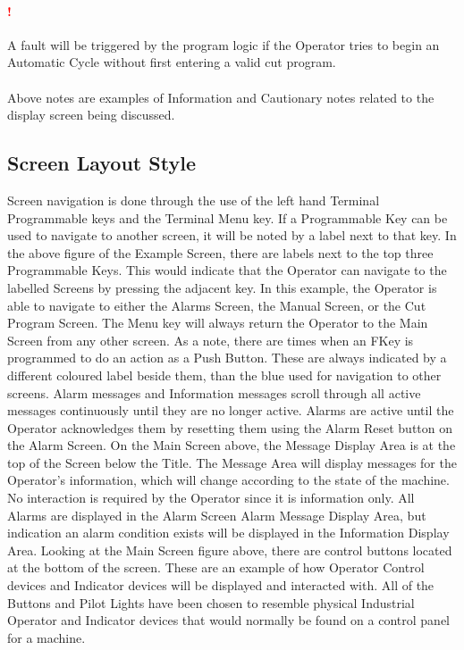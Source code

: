 \paragraph{\textbf{{\LARGE \textcolor{red}{!}}}}A fault will be triggered by the program logic if the Operator tries to begin an Automatic Cycle without first entering a valid cut program.

\paragraph*{}
Above notes are examples of Information and Cautionary notes related to the display screen being discussed. 

\subsection{Screen Layout Style}
 Screen navigation is done through the use of the left hand Terminal Programmable keys and the Terminal Menu key. If a Programmable Key can be used to navigate to another screen, it will be noted by a label next to that key. In the above figure of the Example Screen, there are labels next to the top three Programmable Keys. This would indicate that the Operator can navigate to the labelled Screens by pressing the adjacent key. In this example, the Operator is able to navigate to either the Alarms Screen, the Manual Screen, or the Cut Program Screen. The Menu key will always return the Operator to the Main Screen from any other screen. As a note, there are times when an FKey is programmed to do an action as a Push Button. These are always indicated by a different coloured label beside them, than the blue used for navigation to other screens. Alarm messages and Information messages scroll through all active messages continuously until they are no longer active. Alarms are active until the Operator acknowledges them by resetting them using the Alarm Reset button on the Alarm Screen. On the Main Screen above, the Message Display Area is at the top of the Screen below the Title. The Message Area will display messages for the Operator's information, which will change according to the state of the machine. No interaction is required by the Operator since it is information only. All Alarms are displayed in the Alarm Screen Alarm Message Display Area, but indication an alarm condition exists will be displayed in the Information Display Area. Looking at the Main Screen figure above, there are control buttons located at the bottom of the screen. These are an example of how Operator Control devices and Indicator devices will be displayed and interacted with. All of the Buttons and Pilot Lights have been chosen to resemble physical Industrial Operator and Indicator devices that would normally be found on a control panel for a machine.
